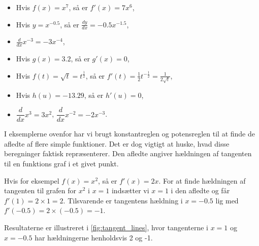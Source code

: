 \begin{example}

    \begin{itemize}
        \item Hvis \(f(x)=x^7\), så er \(f'(x) = 7x^6\),
        \vspace{0.5em}
        \item Hvis \(y = x^{-0.5}\), så er \(\frac{dy}{dx} = -0.5x^{-1.5}\),
        \vspace{0.5em}
        \item \(\frac{d}{dx} x^{-3} = -3x^{-4}\),
        \vspace{0.5em}
        \item Hvis \(g(x) = 3.2\), så er \(g'(x) = 0\),
        \vspace{0.5em}
        \item Hvis \(f(t) = \sqrt{t}=t^{\frac{1}{2}}\), så er \(f'(t) = \frac{1}{2} t^{-\frac{1}{2}}=\frac{1}{2 \sqrt{t}} \),
        \vspace{0.5em}
        \item Hvis \(h(u) = -13.29\), så er \(h'(u) = 0\),
        \vspace{0.5em}
        \item $\dfrac{d}{dx}x^3 = 3x^2$,
        $\dfrac{d}{dx}x^{-2} = -2x^{-3}$.
    \end{itemize}

\end{example}

I eksemplerne ovenfor har vi brugt konstantreglen og potensreglen til at finde de afledte af flere simple funktioner. Det er dog vigtigt at huske, hvad disse beregninger faktisk repræsenterer. Den afledte angiver hældningen af tangenten til en funktions graf i et givet punkt.

Hvis for eksempel $f(x) = x^{2}$, så er $f'(x) = 2x$. For at finde hældningen af tangenten til grafen for $x^{2}$ i $x = 1$ indsætter vi $x = 1$ i den afledte og får $f'(1) = 2 \times 1 = 2$. Tilsvarende er tangentens hældning i $x = -0.5$ lig med $f'(-0.5) = 2 \times (-0.5) = -1$.

Resultaterne er illustreret i \autoref{fig:tangent_lines}, hvor tangenterne i $x = 1$ og $x = -0.5$ har hældningerne henholdsvis 2 og -1.



